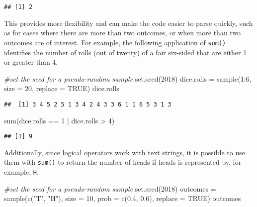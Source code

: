 \documentclass[
]{article}
\newenvironment{Shaded}{\begin{snugshade}}{\end{snugshade}}
\newcommand{\AttributeTok}[1]{\textcolor[rgb]{0.77,0.63,0.00}{#1}}
\newcommand{\CommentTok}[1]{\textcolor[rgb]{0.56,0.35,0.01}{\textit{#1}}}
\newcommand{\ConstantTok}[1]{\textcolor[rgb]{0.00,0.00,0.00}{#1}}
\newcommand{\DecValTok}[1]{\textcolor[rgb]{0.00,0.00,0.81}{#1}}
\newcommand{\FloatTok}[1]{\textcolor[rgb]{0.00,0.00,0.81}{#1}}
\newcommand{\FunctionTok}[1]{\textcolor[rgb]{0.00,0.00,0.00}{#1}}
\newcommand{\NormalTok}[1]{#1}
\newcommand{\OtherTok}[1]{\textcolor[rgb]{0.56,0.35,0.01}{#1}}
\newcommand{\SpecialCharTok}[1]{\textcolor[rgb]{0.00,0.00,0.00}{#1}}
\newcommand{\StringTok}[1]{\textcolor[rgb]{0.31,0.60,0.02}{#1}}
\begin{document}
\begin{verbatim}
## [1] 2
\end{verbatim}

This provides more flexibility and can make the code easier to parse
quickly, such as for cases where there are more than two outcomes, or
when more than two outcomes are of interest. For example, the following
application of \texttt{sum()} identifies the number of rolls (out of
twenty) of a fair six-sided that are either 1 or greater than 4.

\begin{Shaded}
\begin{Highlighting}[]
\CommentTok{\#set the seed for a pseudo{-}random sample}
\FunctionTok{set.seed}\NormalTok{(}\DecValTok{2018}\NormalTok{)}
\NormalTok{dice.rolls }\OtherTok{=} \FunctionTok{sample}\NormalTok{(}\DecValTok{1}\SpecialCharTok{:}\DecValTok{6}\NormalTok{, }\AttributeTok{size =} \DecValTok{20}\NormalTok{, }\AttributeTok{replace =} \ConstantTok{TRUE}\NormalTok{)}
\NormalTok{dice.rolls}
\end{Highlighting}
\end{Shaded}

\begin{verbatim}
##  [1] 3 4 5 2 5 1 3 4 2 4 3 3 6 1 1 6 5 3 1 3
\end{verbatim}

\begin{Shaded}
\begin{Highlighting}[]
\FunctionTok{sum}\NormalTok{(dice.rolls }\SpecialCharTok{==} \DecValTok{1} \SpecialCharTok{|}\NormalTok{ dice.rolls }\SpecialCharTok{\textgreater{}} \DecValTok{4}\NormalTok{)}
\end{Highlighting}
\end{Shaded}

\begin{verbatim}
## [1] 9
\end{verbatim}

Additionally, since logical operators work with text strings, it is
possible to use them with \texttt{sum()} to return the number of heads
if heads is represented by, for example, \texttt{H}.

\begin{Shaded}
\begin{Highlighting}[]
\CommentTok{\#set the seed for a pseudo{-}random sample}
\FunctionTok{set.seed}\NormalTok{(}\DecValTok{2018}\NormalTok{)}
\NormalTok{outcomes }\OtherTok{=} \FunctionTok{sample}\NormalTok{(}\FunctionTok{c}\NormalTok{(}\StringTok{"T"}\NormalTok{, }\StringTok{"H"}\NormalTok{), }\AttributeTok{size =} \DecValTok{10}\NormalTok{, }\AttributeTok{prob =} \FunctionTok{c}\NormalTok{(}\FloatTok{0.4}\NormalTok{, }\FloatTok{0.6}\NormalTok{), }\AttributeTok{replace =} \ConstantTok{TRUE}\NormalTok{)}
\NormalTok{outcomes}
\end{Highlighting}
\end{Shaded}
\end{document}
